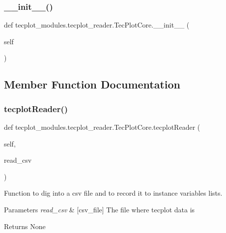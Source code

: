 \subsubsection{\texorpdfstring{\+\_\+\+\_\+init\+\_\+\+\_\+()}{\_\_init\_\_()}}
{\footnotesize\ttfamily def tecplot\+\_\+modules.\+tecplot\+\_\+reader.\+Tec\+Plot\+Core.\+\_\+\+\_\+init\+\_\+\+\_\+ (\begin{DoxyParamCaption}\item[{}]{self }\end{DoxyParamCaption})}



\subsection{Member Function Documentation}
\hypertarget{classtecplot__modules_1_1tecplot__reader_1_1_tec_plot_core_a9cf438934b57cd1d0bef90bcc00f27ac}{}\label{classtecplot__modules_1_1tecplot__reader_1_1_tec_plot_core_a9cf438934b57cd1d0bef90bcc00f27ac} 
\subsubsection{\texorpdfstring{tecplot\+Reader()}{tecplotReader()}}
{\footnotesize\ttfamily def tecplot\+\_\+modules.\+tecplot\+\_\+reader.\+Tec\+Plot\+Core.\+tecplot\+Reader (\begin{DoxyParamCaption}\item[{}]{self,  }\item[{}]{read\+\_\+csv }\end{DoxyParamCaption})}



Function to dig into a csv file and to record it to instance variables lists. 


\begin{DoxyParams}{Parameters}
{\em read\+\_\+csv} & \mbox{[}csv\+\_\+file\mbox{]} The file where tecplot data is \\
\hline
\end{DoxyParams}
\begin{DoxyReturn}{Returns}
None 
\end{DoxyReturn}



